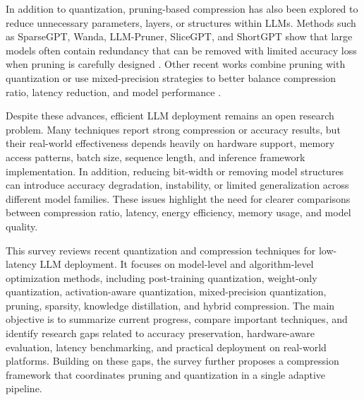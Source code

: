 In addition to quantization, pruning-based compression has also been explored to reduce unnecessary parameters, layers, or structures within LLMs. Methods such as SparseGPT, Wanda, LLM-Pruner, SliceGPT, and ShortGPT show that large models often contain redundancy that can be removed with limited accuracy loss when pruning is carefully designed \cite{frantar2023sparsegpt,ma2023llmpruner,sun2024wanda,ashkboos2024slicegpt,men2024shortgpt}. Other recent works combine pruning with quantization or use mixed-precision strategies to better balance compression ratio, latency reduction, and model performance \cite{xu2026daypq,cho2025sub4bit,wang2025ofqllm}.

Despite these advances, efficient LLM deployment remains an open research problem. Many techniques report strong compression or accuracy results, but their real-world effectiveness depends heavily on hardware support, memory access patterns, batch size, sequence length, and inference framework implementation. In addition, reducing bit-width or removing model structures can introduce accuracy degradation, instability, or limited generalization across different model families. These issues highlight the need for clearer comparisons between compression ratio, latency, energy efficiency, memory usage, and model quality.

This survey reviews recent quantization and compression techniques for low-latency LLM deployment. It focuses on model-level and algorithm-level optimization methods, including post-training quantization, weight-only quantization, activation-aware quantization, mixed-precision quantization, pruning, sparsity, knowledge distillation, and hybrid compression. The main objective is to summarize current progress, compare important techniques, and identify research gaps related to accuracy preservation, hardware-aware evaluation, latency benchmarking, and practical deployment on real-world platforms. Building on these gaps, the survey further proposes a compression framework that coordinates pruning and quantization in a single adaptive pipeline.

